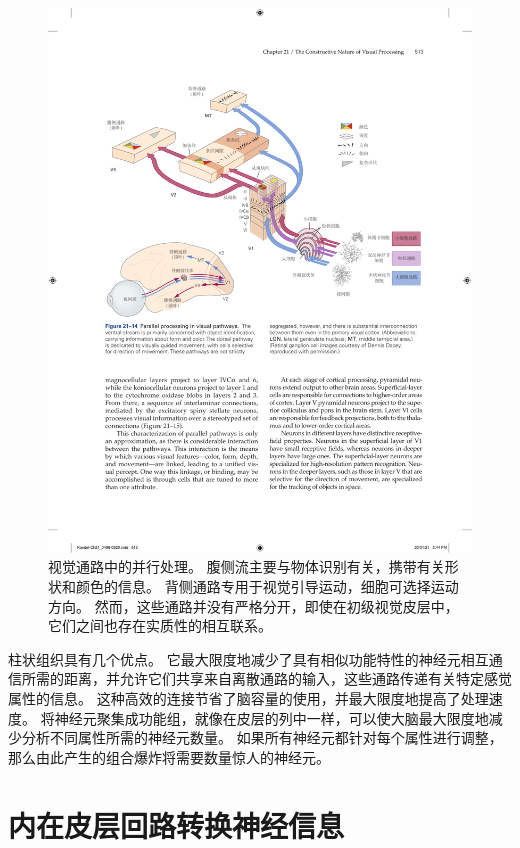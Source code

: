 \begin{figure}[htbp]
	\centering
	\includegraphics[width=1.0\linewidth]{chap21/fig_21_14}
	\caption{视觉通路中的并行处理。
		腹侧流主要与物体识别有关，携带有关形状和颜色的信息。
		背侧通路专用于视觉引导运动，细胞可选择运动方向。
		然而，这些通路并没有严格分开，即使在初级视觉皮层中，它们之间也存在实质性的相互联系。}
	\label{fig:21_14}
\end{figure}


柱状组织具有几个优点。
它最大限度地减少了具有相似功能特性的神经元相互通信所需的距离，并允许它们共享来自离散通路的输入，这些通路传递有关特定感觉属性的信息。
这种高效的连接节省了脑容量的使用，并最大限度地提高了处理速度。
将神经元聚集成功能组，就像在皮层的列中一样，可以使大脑最大限度地减少分析不同属性所需的神经元数量。
如果所有神经元都针对每个属性进行调整，那么由此产生的组合爆炸将需要数量惊人的神经元。



\section{内在皮层回路转换神经信息}

